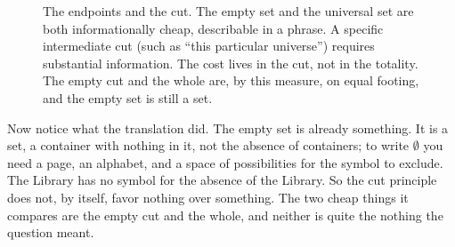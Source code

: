 \begin{figure}[h]
\centering
{}
\caption{The endpoints and the cut. The empty set and the universal set are both informationally cheap, describable in a phrase. A specific intermediate cut (such as ``this particular universe'') requires substantial information. The cost lives in the cut, not in the totality. The empty cut and the whole are, by this measure, on equal footing, and the empty set is still a set.}
\label{fig:endpoint-spectrum}
\end{figure}

Now notice what the translation did. The empty set is already something. It is a set, a container with nothing in it, not the absence of containers; to write $\emptyset$ you need a page, an alphabet, and a space of possibilities for the symbol to exclude. The Library has no symbol for the absence of the Library. So the cut principle does not, by itself, favor nothing over something. The two cheap things it compares are the empty cut and the whole, and neither is quite the nothing the question meant.

